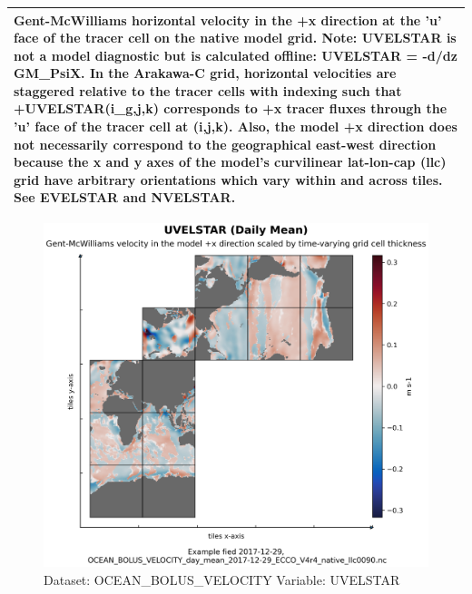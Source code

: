\begin{longtable}{|p{}|p{}|p{}|p{}|}
\multicolumn{4}{|p{1\textwidth}|}{Gent-McWilliams horizontal velocity in the +x direction at the 'u' face of the tracer cell on the native model grid. Note: UVELSTAR is not a model diagnostic but is calculated offline: UVELSTAR = -d/dz GM\_PsiX. In the Arakawa-C grid, horizontal velocities are staggered relative to the tracer cells with indexing such that +UVELSTAR(i\_g,j,k) corresponds to +x tracer fluxes through the 'u' face of the tracer cell at (i,j,k). Also, the model +x direction does not necessarily correspond to the geographical east-west direction because the x and y axes of the model's curvilinear lat-lon-cap (llc) grid have arbitrary orientations which vary within and across tiles. See EVELSTAR and NVELSTAR.} \\ \hline
\end{longtable}

\begin{figure}[H]
\centering
\includegraphics[width=\textwidth]{../images/plots/native_plots/Gent-McWilliams_Ocean_Bolus_Velocity/UVELSTAR.png}
\caption{Dataset: OCEAN\_BOLUS\_VELOCITY Variable: UVELSTAR}
\label{tab:table-OCEAN_BOLUS_VELOCITY_UVELSTAR-Plot}
\end{figure}
\pagebreak
